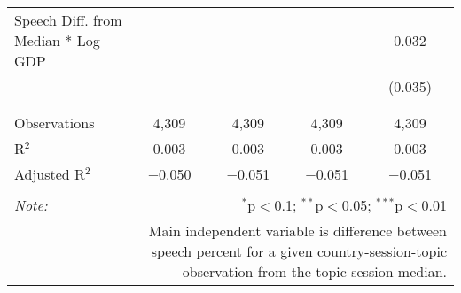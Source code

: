 \begin{table}[!htbp]
\begin{tabular}{@{\extracolsep{5pt}}lcccc}
 Speech Diff. from Median * Log GDP &  &  &  & 0.032 \\ 
  &  &  &  & (0.035) \\ 
  & & & & \\ 
\hline \\[-1.8ex] 
Observations & 4,309 & 4,309 & 4,309 & 4,309 \\ 
R$^{2}$ & 0.003 & 0.003 & 0.003 & 0.003 \\ 
Adjusted R$^{2}$ & $-$0.050 & $-$0.051 & $-$0.051 & $-$0.051 \\ 
\hline 
\hline \\[-1.8ex] 
\textit{Note:}  & \multicolumn{4}{r}{$^{*}$p$<$0.1; $^{**}$p$<$0.05; $^{***}$p$<$0.01} \\ 
 & \multicolumn{4}{r}{Main independent variable is difference between speech percent for a given country-session-topic observation from the topic-session median.} \\ 
\end{tabular} 
\end{table} 
